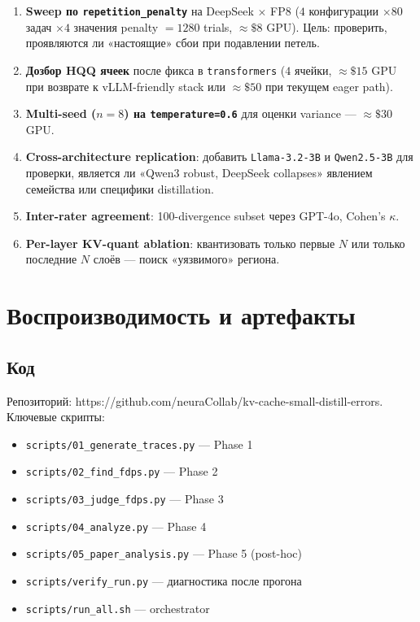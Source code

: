 \documentclass[11pt, a4paper]{article}
\newcommand{\code}[1]{\texttt{#1}}
\begin{document}
\begin{enumerate}[leftmargin=*]
\item \textbf{Sweep по \code{repetition\_penalty}} на DeepSeek $\times$
FP8 ($4$ конфигурации $\times 80$ задач $\times 4$ значения penalty
$= 1280$ trials, $\approx \$8$ GPU). Цель: проверить, проявляются ли
«настоящие» сбои при подавлении петель.

\item \textbf{Дозбор HQQ ячеек} после фикса в \code{transformers}
($4$ ячейки, $\approx \$15$ GPU при возврате к vLLM-friendly stack или
$\approx \$50$ при текущем eager path).

\item \textbf{Multi-seed ($n=8$) на \code{temperature=0.6}} для оценки
variance — $\approx \$30$ GPU.

\item \textbf{Cross-architecture replication}: добавить
\code{Llama-3.2-3B} и \code{Qwen2.5-3B} для проверки, является ли
«Qwen3 robust, DeepSeek collapses» явлением семейства или специфики
distillation.

\item \textbf{Inter-rater agreement}: 100-divergence subset через
GPT-4o, Cohen's $\kappa$.

\item \textbf{Per-layer KV-quant ablation}: квантизовать только первые
$N$ или только последние $N$ слоёв — поиск «уязвимого» региона.
\end{enumerate}

\section{Воспроизводимость и артефакты}

\subsection{Код}

Репозиторий: https://github.com/neuraCollab/kv-cache-small-distill-errors. Ключевые скрипты:
\begin{itemize}[leftmargin=*, itemsep=0pt]
\item \code{scripts/01\_generate\_traces.py} — Phase 1
\item \code{scripts/02\_find\_fdps.py} — Phase 2
\item \code{scripts/03\_judge\_fdps.py} — Phase 3
\item \code{scripts/04\_analyze.py} — Phase 4
\item \code{scripts/05\_paper\_analysis.py} — Phase 5 (post-hoc)
\item \code{scripts/verify\_run.py} — диагностика после прогона
\item \code{scripts/run\_all.sh} — orchestrator
\end{itemize}
\end{document}
